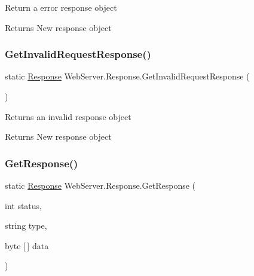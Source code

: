 Return a error response object 

\begin{DoxyReturn}{Returns}
New response object
\end{DoxyReturn}
\mbox{\label{class_web_server_1_1_response_a4c07fb11cc4ca0f8b2c83dbcc7054c69}} 
\subsubsection{\texorpdfstring{Get\+Invalid\+Request\+Response()}{GetInvalidRequestResponse()}}
{\footnotesize\ttfamily static \hyperlink{class_web_server_1_1_response}{Response} Web\+Server.\+Response.\+Get\+Invalid\+Request\+Response (\begin{DoxyParamCaption}{ }\end{DoxyParamCaption})\hspace{0.3cm}{\ttfamily [static]}}



Returns an invalid response object 

\begin{DoxyReturn}{Returns}
New response object
\end{DoxyReturn}
\mbox{\label{class_web_server_1_1_response_ad86b4d35ec228a530f3b4752f70145ec}} 
\subsubsection{\texorpdfstring{Get\+Response()}{GetResponse()}}
{\footnotesize\ttfamily static \hyperlink{class_web_server_1_1_response}{Response} Web\+Server.\+Response.\+Get\+Response (\begin{DoxyParamCaption}\item[{int}]{status,  }\item[{string}]{type,  }\item[{byte \mbox{[}$\,$\mbox{]}}]{data }\end{DoxyParamCaption})\hspace{0.3cm}{\ttfamily [static]}}



